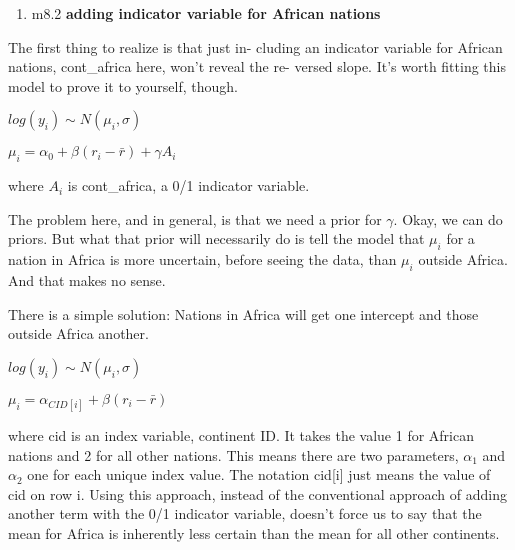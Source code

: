 \documentclass[
]{article}
\providecommand{\tightlist}{%
  \setlength{\itemsep}{0pt}\setlength{\parskip}{0pt}}
\begin{document}
\begin{enumerate}
\def\labelenumi{\arabic{enumi}.}
\setcounter{enumi}{1}
\tightlist
\item
  m8.2 \textbf{adding indicator variable for African nations}
\end{enumerate}

The first thing to realize is that just in- cluding an indicator
variable for African nations, cont\_africa here, won't reveal the re-
versed slope. It's worth fitting this model to prove it to yourself,
though.

\(log(y_i) \sim N(\mu_i, \sigma)\)

\(\mu_i = \alpha_0 + \beta (r_i - \bar{r}) + \gamma A_i\)

where \(A_i\) is cont\_africa, a 0/1 indicator variable.

The problem here, and in general, is that we need a prior for
\(\gamma\). Okay, we can do priors. But what that prior will necessarily
do is tell the model that \(\mu_i\) for a nation in Africa is more
uncertain, before seeing the data, than \(\mu_i\) outside Africa. And
that makes no sense.

There is a simple solution: Nations in Africa will get one intercept and
those outside Africa another.

\(log(y_i) \sim N(\mu_i, \sigma)\)

\(\mu_i = \alpha_{CID[i]} + \beta (r_i - \bar{r})\)

where cid is an index variable, continent ID. It takes the value 1 for
African nations and 2 for all other nations. This means there are two
parameters, \(\alpha_{1}\) and \(\alpha_{2}\) one for each unique index
value. The notation cid{[}i{]} just means the value of cid on row i.
Using this approach, instead of the conventional approach of adding
another term with the 0/1 indicator variable, doesn't force us to say
that the mean for Africa is inherently less certain than the mean for
all other continents.
\end{document}
